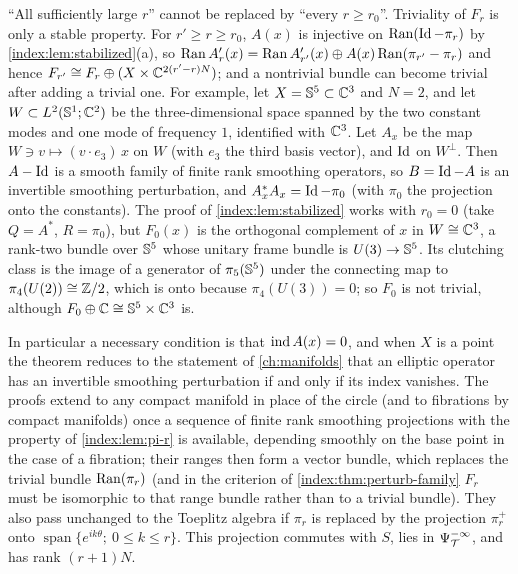 \begin{remark}\label{index:rem:perturb-family-large-r}
  ``All sufficiently large $r$'' cannot be replaced by ``every $r\ge r_0$''.
  Triviality of $F_r$ is only a stable property. For $r'\ge r\ge r_0$,
  $A(x)$ is injective on $\operatorname{Ran}(\operatorname{Id}-\pi_r)$ by
  \cref{index:lem:stabilized}(a), so
  $\operatorname{Ran} A'_r(x)=\operatorname{Ran} A'_{r'}(x)\oplus A(x)\operatorname{Ran}(\pi_{r'}-\pi_r)$ and hence
  $F_{r'}\cong F_r\oplus(X\times\mathbb{C}^{2(r'-r)N})$; and a nontrivial bundle can become trivial after adding
  a trivial one. For example, let $X=\mathbb{S}^5\subset\mathbb{C}^3$ and $N=2$, and let
  $W\subset L^2(\mathbb{S}^1;\mathbb{C}^2)$ be the three-dimensional space spanned by
  the two constant modes and one mode of frequency $1$, identified with
  $\mathbb{C}^3$. Let $A_x$ be the map $W\ni v\mapsto(v\cdot e_3)\,x$ on $W$
  (with $e_3$ the third basis vector), and $\operatorname{Id}$ on $W^\perp$. Then
  $A-\operatorname{Id}$ is a smooth family of finite rank smoothing operators, so $B=\operatorname{Id}-A$
  is an invertible smoothing perturbation, and $A_x^*A_x=\operatorname{Id}-\pi_0$ (with
  $\pi_0$ the projection onto the constants). The proof of
  \cref{index:lem:stabilized} works with $r_0=0$ (take $Q=A^*$, $R=\pi_0$),
  but $F_0(x)$ is the orthogonal complement of $x$ in $W\cong\mathbb{C}^3$, a
  rank-two bundle over $\mathbb{S}^5$ whose unitary frame bundle is
  $U(3)\to\mathbb{S}^5$. Its clutching class is the image of a generator of
  $\pi_5(\mathbb{S}^5)$ under the connecting map to $\pi_4(U(2))\cong\mathbb{Z}/2$,
  which is onto because $\pi_4(U(3))=0$; so $F_0$ is not trivial, although
  $F_0\oplus\mathbb{C}\cong\mathbb{S}^5\times\mathbb{C}^3$ is.
\end{remark}

In particular a necessary condition is that $\operatorname{ind} A(x)=0$, and when $X$ is a
point the theorem reduces to the statement of \cref{ch:manifolds} that an
elliptic operator has an invertible smoothing perturbation if and only if its
index vanishes. The proofs extend to any compact manifold in place of the
circle (and to fibrations by compact manifolds) once a sequence of finite rank
smoothing projections with the property of \cref{index:lem:pi-r} is
available, depending smoothly on the base point in the case of a fibration;
their ranges then form a vector bundle, which replaces the trivial bundle
$\operatorname{Ran}(\pi_r)$ (and in the criterion of \cref{index:thm:perturb-family} $F_r$
must be isomorphic to that range bundle rather than to a trivial bundle). They also pass unchanged to the Toeplitz algebra if $\pi_r$ is
replaced by the projection $\pi^+_r$ onto $\operatorname{span}\{e^{ik\theta};\
0\le k\le r\}$. This projection commutes with $S$, lies in $\Psi^{-\infty}_{\mathcal T}$,
and has rank $(r+1)N$.

